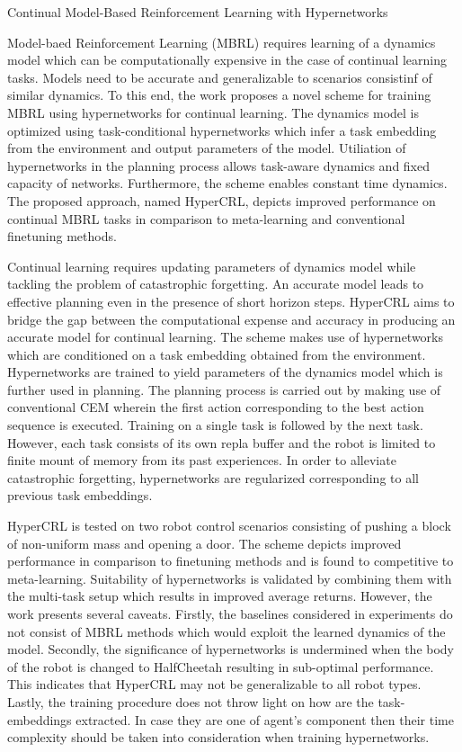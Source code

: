 \documentclass[11pt,letterpaper]{article}
\begin{document}
\begin{center}
  \large{Continual Model-Based Reinforcement Learning with Hypernetworks}
\end{center}

Model-baed Reinforcement Learning (MBRL) requires learning of a dynamics model which can be computationally expensive in the case of continual learning tasks. Models need to be accurate and generalizable to scenarios consistinf of similar dynamics. To this end, the work proposes a novel scheme for training MBRL using hypernetworks for continual learning. The dynamics model is optimized using task-conditional hypernetworks which infer a task embedding from the environment and output parameters of the model. Utiliation of hypernetworks in the planning process allows task-aware dynamics and fixed capacity of networks. Furthermore, the scheme enables constant time dynamics. The proposed approach, named HyperCRL, depicts improved performance on continual MBRL tasks in comparison to meta-learning and conventional finetuning methods. 

Continual learning requires updating parameters of dynamics model while tackling the problem of catastrophic forgetting. An accurate model leads to effective planning even in the presence of short horizon steps. HyperCRL aims to bridge the gap between the computational expense and accuracy in producing an accurate model for continual learning. The scheme makes use of hypernetworks which are conditioned on a task embedding obtained from the environment. Hypernetworks are trained to yield parameters of the dynamics model which is further used in planning. The planning process is carried out by making use of conventional CEM wherein the first action corresponding to the best action sequence is executed. Training on a single task is followed by the next task. However, each task consists of its own repla buffer and the robot is limited to finite mount of memory from its past experiences. In order to alleviate catastrophic forgetting, hypernetworks are regularized corresponding to all previous task embeddings. 

HyperCRL is tested on two robot control scenarios consisting of pushing a block of non-uniform mass and opening a door. The scheme depicts improved performance in comparison to finetuning methods and is found to competitive to meta-learning. Suitability of hypernetworks is validated by combining them with the multi-task setup which results in improved average returns. However, the work presents several caveats. Firstly, the baselines considered in experiments do not consist of MBRL methods which would exploit the learned dynamics of the model. Secondly, the significance of hypernetworks is undermined when the body of the robot is changed to HalfCheetah resulting in sub-optimal performance. This indicates that HyperCRL may not be generalizable to all robot types. Lastly, the training procedure does not throw light on how are the task-embeddings extracted. In case they are one of agent's component then their time complexity should be taken into consideration when training hypernetworks. 
\end{document}

